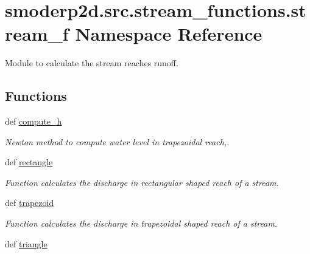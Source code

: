 \hypertarget{namespacesmoderp2d_1_1src_1_1stream__functions_1_1stream__f}{\section{smoderp2d.\-src.\-stream\-\_\-functions.\-stream\-\_\-f Namespace Reference}
\label{namespacesmoderp2d_1_1src_1_1stream__functions_1_1stream__f}
}


Module to calculate the stream reaches runoff.  


\subsection*{Functions}
\begin{DoxyCompactItemize}
\item 
def \hyperlink{namespacesmoderp2d_1_1src_1_1stream__functions_1_1stream__f_a0be76eafc2faa42a7c91ef3af58c4af4}{compute\-\_\-h}
\begin{DoxyCompactList}\small\item\em Newton method to compute water level in trapezoidal reach,. \end{DoxyCompactList}\item 
\hypertarget{namespacesmoderp2d_1_1src_1_1stream__functions_1_1stream__f_abc523e971bfc320118a92c0a5358b9a0}{def \hyperlink{namespacesmoderp2d_1_1src_1_1stream__functions_1_1stream__f_abc523e971bfc320118a92c0a5358b9a0}{rectangle}}\label{namespacesmoderp2d_1_1src_1_1stream__functions_1_1stream__f_abc523e971bfc320118a92c0a5358b9a0}

\begin{DoxyCompactList}\small\item\em Function calculates the discharge in rectangular shaped reach of a stream. \end{DoxyCompactList}\item 
\hypertarget{namespacesmoderp2d_1_1src_1_1stream__functions_1_1stream__f_a81a1132058b2a08d068f99bf9e934db9}{def \hyperlink{namespacesmoderp2d_1_1src_1_1stream__functions_1_1stream__f_a81a1132058b2a08d068f99bf9e934db9}{trapezoid}}\label{namespacesmoderp2d_1_1src_1_1stream__functions_1_1stream__f_a81a1132058b2a08d068f99bf9e934db9}

\begin{DoxyCompactList}\small\item\em Function calculates the discharge in trapezoidal shaped reach of a stream. \end{DoxyCompactList}\item 
\hypertarget{namespacesmoderp2d_1_1src_1_1stream__functions_1_1stream__f_a80ffca49de8ec1e85869262bb46fa29c}{def \hyperlink{namespacesmoderp2d_1_1src_1_1stream__functions_1_1stream__f_a80ffca49de8ec1e85869262bb46fa29c}{triangle}}\label{namespacesmoderp2d_1_1src_1_1stream__functions_1_1stream__f_a80ffca49de8ec1e85869262bb46fa29c}


\end{DoxyCompactItemize}

